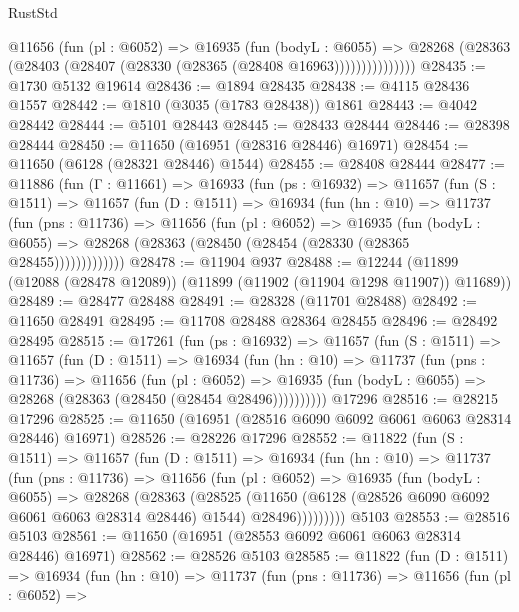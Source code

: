 \begin{lexlean}{RustStd}
\begin{coremodule}
                @11656
                  (fun (pl : @6052) =>
                  @16935
                    (fun (bodyL : @6055) =>
                    @28268 (@28363 (@28403 (@28407 (@28330 (@28365 (@28408 @16963)))))))))))))))
@28435 := @1730 @5132 @19614
@28436 := @1894 @28435
@28438 := @4115 @28436 @1557
@28442 := @1810 (@3035 (@1783 @28438)) @1861
@28443 := @4042 @28442
@28444 := @5101 @28443
@28445 := @28433 @28444
@28446 := @28398 @28444
@28450 := @11650 (@16951 (@28316 @28446) @16971)
@28454 := @11650 (@6128 (@28321 @28446) @1544)
@28455 := @28408 @28444
@28477 := @11886
    (fun (Γ : @11661) =>
    @16933
      (fun (ps : @16932) =>
      @11657
        (fun (S : @1511) =>
        @11657
          (fun (D : @1511) =>
          @16934
            (fun (hn : @10) =>
            @11737
              (fun (pns : @11736) =>
              @11656
                (fun (pl : @6052) =>
                @16935
                  (fun (bodyL : @6055) =>
                  @28268 (@28363 (@28450 (@28454 (@28330 (@28365 @28455)))))))))))))
@28478 := @11904 @937
@28488 := @12244 (@11899 (@12088 (@28478 @12089)) (@11899 (@11902 (@11904 @1298 @11907)) @11689))
@28489 := @28477 @28488
@28491 := @28328 (@11701 @28488)
@28492 := @11650 @28491
@28495 := @11708 @28488 @28364 @28455
@28496 := @28492 @28495
@28515 := @17261
    (fun (ps : @16932) =>
    @11657
      (fun (S : @1511) =>
      @11657
        (fun (D : @1511) =>
        @16934
          (fun (hn : @10) =>
          @11737
            (fun (pns : @11736) =>
            @11656
              (fun (pl : @6052) =>
              @16935 (fun (bodyL : @6055) => @28268 (@28363 (@28450 (@28454 @28496))))))))))
    @17296
@28516 := @28215 @17296
@28525 := @11650 (@16951 (@28516 @6090 @6092 @6061 @6063 @28314 @28446) @16971)
@28526 := @28226 @17296
@28552 := @11822
    (fun (S : @1511) =>
    @11657
      (fun (D : @1511) =>
      @16934
        (fun (hn : @10) =>
        @11737
          (fun (pns : @11736) =>
          @11656
            (fun (pl : @6052) =>
            @16935
              (fun (bodyL : @6055) =>
              @28268
                (@28363
                  (@28525
                    (@11650
                      (@6128 (@28526 @6090 @6092 @6061 @6063 @28314 @28446) @1544)
                      @28496)))))))))
    @5103
@28553 := @28516 @5103
@28561 := @11650 (@16951 (@28553 @6092 @6061 @6063 @28314 @28446) @16971)
@28562 := @28526 @5103
@28585 := @11822
    (fun (D : @1511) =>
    @16934
      (fun (hn : @10) =>
      @11737
        (fun (pns : @11736) =>
        @11656
          (fun (pl : @6052) =>

\end{coremodule}
\end{lexlean}
